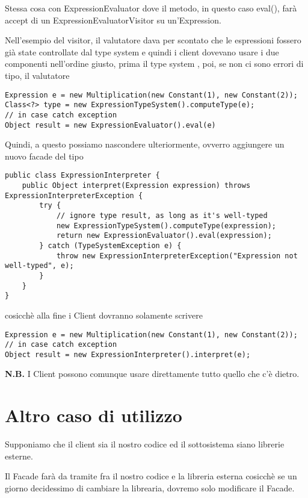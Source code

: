 Stessa cosa con ExpressionEvaluator dove il metodo, in questo caso eval(), farà accept di un ExpressionEvaluatorVisitor su un'Expression.

Nell'esempio del visitor, il valutatore dava per scontato che le espressioni fossero già state controllate dal type system e quindi i client dovevano usare i due 
componenti nell’ordine giusto, prima il type system , poi, se non ci sono errori di tipo, il valutatore
\begin{lstlisting}
Expression e = new Multiplication(new Constant(1), new Constant(2));
Class<?> type = new ExpressionTypeSystem().computeType(e);
// in case catch exception
Object result = new ExpressionEvaluator().eval(e)
\end{lstlisting}

Quindi, a questo possiamo nascondere ulteriormente, ovverro aggiungere un nuovo facade del tipo
\begin{lstlisting}
public class ExpressionInterpreter {
    public Object interpret(Expression expression) throws ExpressionInterpreterException {
        try {
            // ignore type result, as long as it's well-typed
            new ExpressionTypeSystem().computeType(expression);
            return new ExpressionEvaluator().eval(expression);
        } catch (TypeSystemException e) {
            throw new ExpressionInterpreterException("Expression not well-typed", e);
        }
    }
}
\end{lstlisting}

cosicchè alla fine i Client dovranno solamente scrivere
\begin{lstlisting}
Expression e = new Multiplication(new Constant(1), new Constant(2));
// in case catch exception
Object result = new ExpressionInterpreter().interpret(e);
\end{lstlisting}

\textbf{N.B.} I Client possono comunque usare direttamente tutto quello che c'è dietro.

\section{Altro caso di utilizzo}

Supponiamo che il client sia il nostro codice ed il sottosistema siano librerie esterne.

Il Facade farà da tramite fra il nostro codice e la libreria esterna cosicchè se un giorno decidessimo di cambiare la librearia, dovremo solo modificare il Facade.